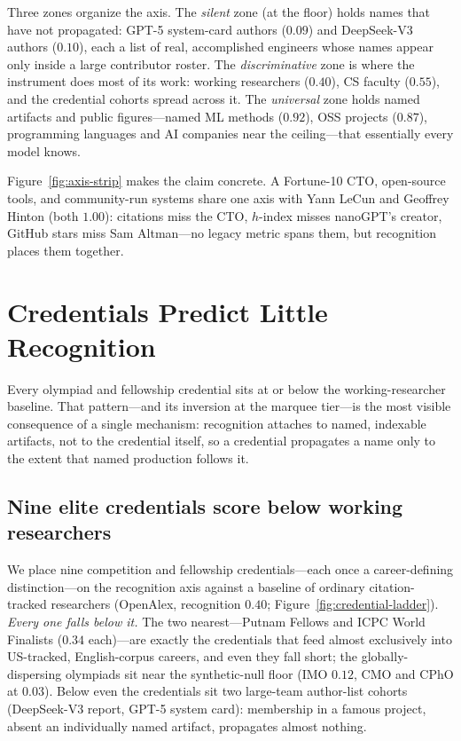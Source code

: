 \documentclass[11pt]{article}
\begin{document}
Three zones organize the axis. The \emph{silent} zone (at the floor) holds names that have not propagated: GPT-5 system-card authors ($0.09$) and DeepSeek-V3 authors ($0.10$), each a list of real, accomplished engineers whose names appear only inside a large contributor roster. The \emph{discriminative} zone is where the instrument does most of its work: working researchers ($0.40$), CS faculty ($0.55$), and the credential cohorts spread across it. The \emph{universal} zone holds named artifacts and public figures---named ML methods ($0.92$), OSS projects ($0.87$), programming languages and AI companies near the ceiling---that essentially every model knows.

Figure~\ref{fig:axis-strip} makes the claim concrete. A Fortune-10 CTO, open-source tools, and community-run systems share one axis with Yann LeCun and Geoffrey Hinton (both $1.00$): citations miss the CTO, $h$-index misses nanoGPT's creator, GitHub stars miss Sam Altman---no legacy metric spans them, but recognition places them together.

\section{Credentials Predict Little Recognition}
\label{sec:results-credentials}

Every olympiad and fellowship credential sits at or below the working-researcher baseline. That pattern---and its inversion at the marquee tier---is the most visible consequence of a single mechanism: recognition attaches to named, indexable artifacts, not to the credential itself, so a credential propagates a name only to the extent that named production follows it.

\subsection{Nine elite credentials score below working researchers}

We place nine competition and fellowship credentials---each once a career-defining distinction---on the recognition axis against a baseline of ordinary citation-tracked researchers (OpenAlex, recognition $0.40$; Figure~\ref{fig:credential-ladder}). \emph{Every one falls below it.} The two nearest---Putnam Fellows and ICPC World Finalists ($0.34$ each)---are exactly the credentials that feed almost exclusively into US-tracked, English-corpus careers, and even they fall short; the globally-dispersing olympiads sit near the synthetic-null floor (IMO $0.12$, CMO and CPhO at $0.03$). Below even the credentials sit two large-team author-list cohorts (DeepSeek-V3 report, GPT-5 system card): membership in a famous project, absent an individually named artifact, propagates almost nothing.
\end{document}
